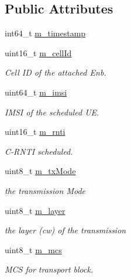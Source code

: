 \subsection*{Public Attributes}
\begin{DoxyCompactItemize}
\item 
int64\+\_\+t \hyperlink{structns3_1_1PhyTransmissionStatParameters_a2df3280c675902ccce90e8ea04f18ea4}{m\+\_\+timestamp}
\item 
uint16\+\_\+t \hyperlink{structns3_1_1PhyTransmissionStatParameters_aa22689086849b94c2f5c35545807d94e}{m\+\_\+cell\+Id}
\begin{DoxyCompactList}\small\item\em Cell ID of the attached Enb. \end{DoxyCompactList}\item 
uint64\+\_\+t \hyperlink{structns3_1_1PhyTransmissionStatParameters_a61afee12f7bec87f431f09c298e4981e}{m\+\_\+imsi}
\begin{DoxyCompactList}\small\item\em I\+M\+SI of the scheduled UE. \end{DoxyCompactList}\item 
uint16\+\_\+t \hyperlink{structns3_1_1PhyTransmissionStatParameters_a67a38610c5bdd69cacce60769ce26f38}{m\+\_\+rnti}
\begin{DoxyCompactList}\small\item\em C-\/\+R\+N\+TI scheduled. \end{DoxyCompactList}\item 
uint8\+\_\+t \hyperlink{structns3_1_1PhyTransmissionStatParameters_a93bb8bd95e41a63fd0ff64411868478e}{m\+\_\+tx\+Mode}
\begin{DoxyCompactList}\small\item\em the transmission Mode \end{DoxyCompactList}\item 
uint8\+\_\+t \hyperlink{structns3_1_1PhyTransmissionStatParameters_a3a44ee0d8c9791d51f3b5dcae82806ca}{m\+\_\+layer}
\begin{DoxyCompactList}\small\item\em the layer (cw) of the transmission \end{DoxyCompactList}\item 
uint8\+\_\+t \hyperlink{structns3_1_1PhyTransmissionStatParameters_aefa800d4df4329d6715faea380a03c7e}{m\+\_\+mcs}
\begin{DoxyCompactList}\small\item\em M\+CS for transport block. \end{DoxyCompactList}\item 

\end{DoxyCompactItemize}
